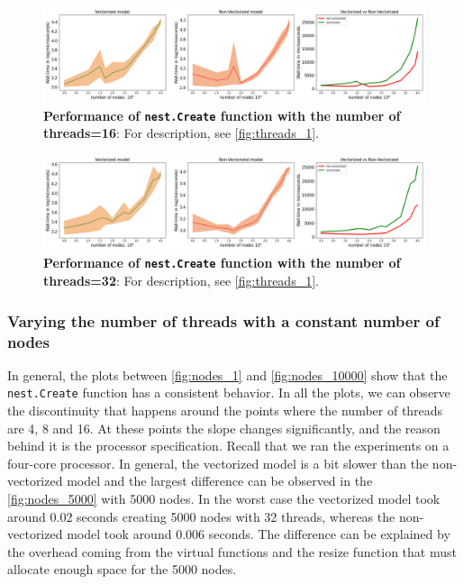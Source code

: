 \begin{figure}[t!]
    \centering
    \includegraphics[width=\textwidth]{src/pic/thread_16.png}
    \caption{\textbf{Performance of \texttt{nest.Create} function with the number of threads=16}: For description, see \autoref{fig:threads_1}.}
    \label{fig:threads_16}
\end{figure}

\begin{figure}[t!]
    \centering
    \includegraphics[width=\textwidth]{src/pic/thread_32.png}
    \caption{\textbf{Performance of \texttt{nest.Create} function with the number of threads=32}: For description, see \autoref{fig:threads_1}.}
    \label{fig:threads_32}
\end{figure}

\subsubsection{Varying the number of threads with a constant number of nodes}


In general, the plots between \autoref{fig:nodes_1} and \autoref{fig:nodes_10000} show that the \texttt{nest.Create} function has a consistent behavior. In all the plots, we can observe the discontinuity that happens around the points where the number of threads are 4, 8 and 16. At these points the slope changes significantly, and the reason behind it is the processor specification. Recall that we ran the experiments on a four-core processor. In general, the vectorized model is a bit slower than the non-vectorized model and the largest difference can be observed in the \autoref{fig:nodes_5000} with 5000 nodes. In the worst case the vectorized model took around 0.02 seconds creating 5000 nodes with 32 threads, whereas the non-vectorized model took around 0.006 seconds. The difference can be explained by the overhead coming from the virtual functions and the resize function that must allocate enough space for the 5000 nodes.

